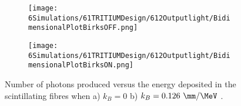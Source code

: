 \begin{figure}
\centering
    \begin{subfigure}[b]{0.6\textwidth}
    \centering
    \texttt{[image: 6Simulations/61TRITIUMDesign/612Outputlight/BidimensionalPlotBirksOFF.png]}  
    \caption{\label{subfig:2DimPlotNoBirks}}
    \end{subfigure}
    \hfill
    \begin{subfigure}[b]{0.6\textwidth}
    \centering
    \texttt{[image: 6Simulations/61TRITIUMDesign/612Outputlight/BidimensionalPlotBirksON.png]}  
    \caption{\label{subfig:2DimPlotBirks}}
    \end{subfigure}
 \caption{Number of photons produced versus the energy deposited in the scintillating fibres when a) $k_B=0$ b) $k_B=0.126~\mm/\MeV$ \cite{SimulationPaperCarlos}.}
 \label{fig:2DimPlotBirks}
\end{figure}